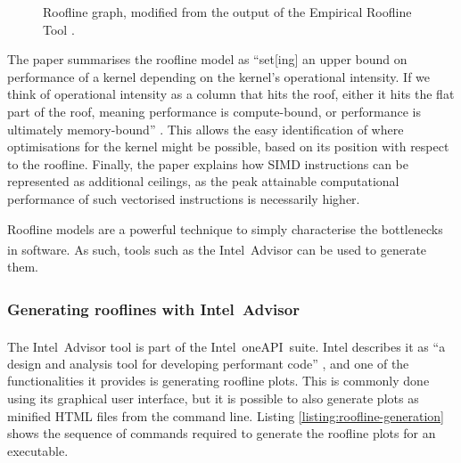 \begin{figure}[H]
    \centering
    
    \vspace*{-0.5cm}
    \caption{Roofline graph, modified from the output of the Empirical Roofline Tool \cite{EmpiricalRooflineTool}.}
    \label{fig:ert-roofline}
\end{figure}

The paper summarises the roofline model as ``set[ing] an upper bound on performance of a kernel depending on the kernel’s operational intensity. If we think of operational intensity as a column that hits the roof, either it hits the flat part of the roof, meaning performance is compute-bound, or performance is ultimately memory-bound'' \cite{williamsRooflineInsightfulVisual2009}. This allows the easy identification of where optimisations for the kernel might be possible, based on its position with respect to the roofline. Finally, the paper explains how \acrfull{SIMD} instructions can be represented as additional ceilings, as the peak attainable computational performance of such vectorised instructions is necessarily higher.


Roofline models are a powerful technique to simply characterise the bottlenecks in software. As such, tools such as the Intel\textsuperscript{\textregistered}\ Advisor can be used to generate them.

\subsubsection{Generating rooflines with Intel\textsuperscript{\textregistered}\ Advisor}
\label{sssec:roofline-generation-intel-advisor}

The Intel\textsuperscript{\textregistered}\ Advisor tool is part of the Intel\textsuperscript{\textregistered}\ oneAPI\texttrademark\ suite. Intel describes it as ``a design and analysis tool for developing performant code'' \cite{DesignCodeParallelism}, and one of the functionalities it provides is generating roofline plots. This is commonly done using its graphical user interface, but it is possible to also generate plots as minified HTML files from the command line. Listing \ref{listing:roofline-generation} shows the sequence of commands required to generate the roofline plots for an executable. 

